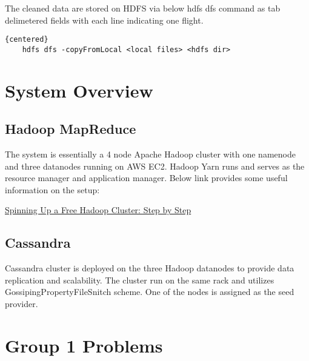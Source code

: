 \documentclass[fontsize=11pt,paper=a4]{scrartcl}
\begin{document}
The cleaned data are stored on HDFS via below hdfs dfs command  as tab delimetered fields with each line indicating one flight. 
\begin{lstlisting}{centered}
	hdfs dfs -copyFromLocal <local files> <hdfs dir>  
\end{lstlisting}
 
\section{System Overview}
\subsection{Hadoop MapReduce}
The system is essentially a 4 node Apache Hadoop cluster with one namenode and three datanodes running on AWS EC2. 
Hadoop Yarn runs and serves as the resource manager and application manager. Below link provides some useful information on the setup: 

\href{https://blog.insightdatascience.com/spinning-up-a-free-hadoop-cluster-step-by-step-c406d56bae42}{Spinning Up a Free Hadoop Cluster: Step by Step}

\subsection{Cassandra} 
Cassandra cluster is deployed on the three Hadoop datanodes to provide data replication and scalability. 
The cluster run on the same rack and utilizes GossipingPropertyFileSnitch scheme. One of the nodes is assigned as the seed provider.
 

 
\section{Group 1 Problems} 
\end{document}
